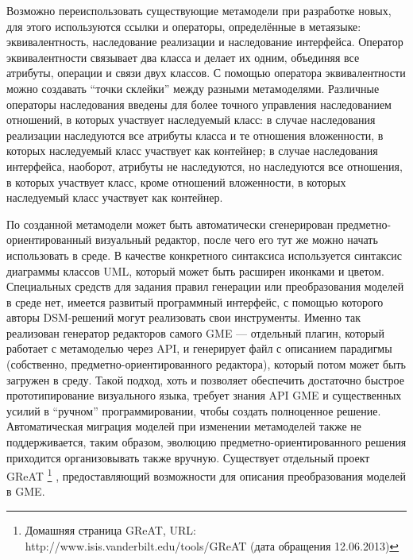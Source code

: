 Возможно переиспользовать существующие метамодели при разработке новых, для этого 
используются ссылки и операторы, определённые в метаязыке: эквивалентность, наследование 
реализации и наследование интерфейса. Оператор эквивалентности связывает два класса 
и делает их одним, объединяя все атрибуты, операции и связи двух классов. С помощью 
оператора эквивалентности можно создавать “точки склейки” между разными метамоделями. 
Различные операторы наследования введены для более точного управления наследованием 
отношений, в которых участвует наследуемый класс: в случае наследования реализации 
наследуются все атрибуты класса и те отношения вложенности, в которых наследуемый 
класс участвует как контейнер; в случае наследования интерфейса, наоборот, атрибуты 
не наследуются, но наследуются все отношения, в которых участвует класс, кроме отношений 
вложенности, в которых наследуемый класс участвует как контейнер.

По созданной метамодели может быть автоматически сгенерирован предметно-ориентированный 
визуальный редактор, после чего его тут же можно начать использовать в среде. В качестве 
конкретного синтаксиса используется синтаксис диаграммы классов UML, который может 
быть расширен иконками и цветом. Специальных средств для задания правил генерации 
или преобразования моделей в среде нет, имеется развитый программный интерфейс, с 
помощью которого авторы DSM-решений могут реализовать свои инструменты. Именно так 
реализован генератор редакторов самого GME --- отдельный плагин, который работает с 
метамоделью через API, и генерирует файл с описанием парадигмы (собственно, предметно-ориентированного 
редактора), который потом может быть загружен в среду. Такой подход, хоть и позволяет 
обеспечить достаточно быстрое прототипирование визуального языка, требует знания API GME 
и существенных усилий в "`ручном"' программировании, чтобы создать полноценное решение. 
Автоматическая миграция моделей при изменении метамоделей также не поддерживается, 
таким образом, эволюцию предметно-ориентированного решения приходится организовывать также вручную. Существует отдельный проект GReAT%
\footnote{Домашняя страница GReAT, URL: http://www.isis.vanderbilt.edu/tools/GReAT (дата обращения 12.06.2013)}%
, предоставляющий возможности для описания преобразования моделей в GME.

